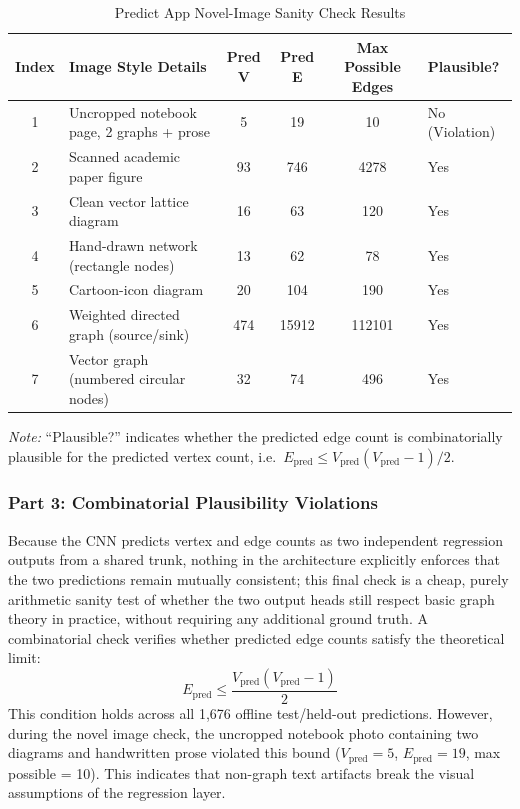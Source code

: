 \documentclass[11pt,letterpaper]{article}
\numberwithin{equation}{section}
\numberwithin{figure}{section}
\numberwithin{table}{section}
\begin{document}
\begin{table}[htbp]
\centering
\caption{Predict App Novel-Image Sanity Check Results}
\label{tab:novel_images}
\small
\begin{tabular}{cp{5.4cm}ccc>{\centering\arraybackslash}p{2.4cm}}
\toprule
Index & Image Style Details & Pred V & Pred E & Max Possible Edges & Plausible? \\
\midrule
1 & Uncropped notebook page, 2 graphs + prose & 5 & 19 & 10 & No (Violation) \\
2 & Scanned academic paper figure & 93 & 746 & 4278 & Yes \\
3 & Clean vector lattice diagram & 16 & 63 & 120 & Yes \\
4 & Hand-drawn network (rectangle nodes) & 13 & 62 & 78 & Yes \\
5 & Cartoon-icon diagram & 20 & 104 & 190 & Yes \\
6 & Weighted directed graph (source/sink) & 474 & 15912 & 112101 & Yes \\
7 & Vector graph (numbered circular nodes) & 32 & 74 & 496 & Yes \\
\bottomrule
\end{tabular}
\begin{flushleft}
\small \textit{Note:} ``Plausible?'' indicates whether the predicted edge count is combinatorially plausible for the predicted vertex count, i.e.\ $E_{\text{pred}} \le V_{\text{pred}}(V_{\text{pred}}-1)/2$.
\end{flushleft}
\end{table}

\subsubsection{Part 3: Combinatorial Plausibility Violations}
Because the CNN predicts vertex and edge counts as two independent regression outputs from a shared trunk, nothing in the architecture explicitly enforces that the two predictions remain mutually consistent; this final check is a cheap, purely arithmetic sanity test of whether the two output heads still respect basic graph theory in practice, without requiring any additional ground truth. A combinatorial check verifies whether predicted edge counts satisfy the theoretical limit:
\begin{equation}
E_{\text{pred}} \le \frac{V_{\text{pred}}(V_{\text{pred}}-1)}{2}
\label{eq:combinatorial}
\end{equation}
This condition holds across all 1,676 offline test/held-out predictions.
However, during the novel image check, the uncropped notebook photo containing two diagrams and handwritten prose violated this bound ($V_{\text{pred}}=5$, $E_{\text{pred}}=19$, max possible = 10). This indicates that non-graph text artifacts break the visual assumptions of the regression layer.
\end{document}
